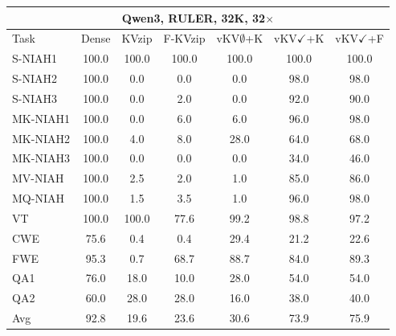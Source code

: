 \begin{tabular}{lcccccc}
\toprule
\multicolumn{7}{c}{Qwen3, RULER, 32K, 32$\times$} \\
\midrule
Task & Dense & KVzip & F-KVzip & vKV$\emptyset$+K & vKV$\checkmark$+K & vKV$\checkmark$+F \\
\midrule
S-NIAH1 & 100.0 & 100.0 & 100.0 & 100.0 & 100.0 & 100.0 \\
S-NIAH2 & 100.0 & 0.0 & 0.0 & 0.0 & 98.0 & 98.0 \\
S-NIAH3 & 100.0 & 0.0 & 2.0 & 0.0 & 92.0 & 90.0 \\
MK-NIAH1 & 100.0 & 0.0 & 6.0 & 6.0 & 96.0 & 98.0 \\
MK-NIAH2 & 100.0 & 4.0 & 8.0 & 28.0 & 64.0 & 68.0 \\
MK-NIAH3 & 100.0 & 0.0 & 0.0 & 0.0 & 34.0 & 46.0 \\
MV-NIAH & 100.0 & 2.5 & 2.0 & 1.0 & 85.0 & 86.0 \\
MQ-NIAH & 100.0 & 1.5 & 3.5 & 1.0 & 96.0 & 98.0 \\
VT & 100.0 & 100.0 & 77.6 & 99.2 & 98.8 & 97.2 \\
CWE & 75.6 & 0.4 & 0.4 & 29.4 & 21.2 & 22.6 \\
FWE & 95.3 & 0.7 & 68.7 & 88.7 & 84.0 & 89.3 \\
QA1 & 76.0 & 18.0 & 10.0 & 28.0 & 54.0 & 54.0 \\
QA2 & 60.0 & 28.0 & 28.0 & 16.0 & 38.0 & 40.0 \\
\midrule
Avg & 92.8 & 19.6 & 23.6 & 30.6 & 73.9 & 75.9 \\
\bottomrule
\end{tabular}
\vspace{0.8em}

